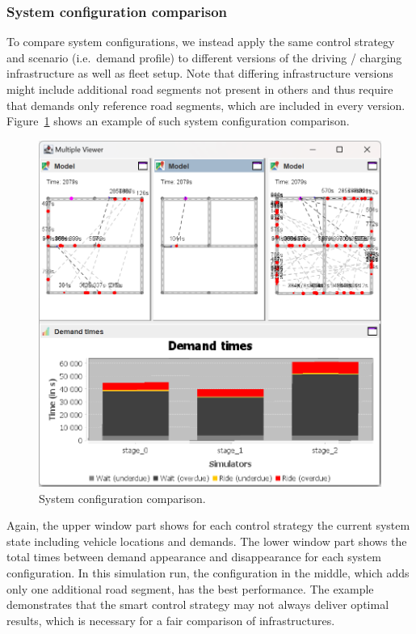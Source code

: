 \documentclass[a4paper,twoside]{article}
\begin{document}
	\subsubsection{System configuration comparison}
	\label{sec:infrastructure-comparison}
	
	To compare system configurations, we instead apply the same control strategy and scenario (i.e.\ demand profile) to different versions of the driving / charging infrastructure as well as fleet setup.
	Note that differing infrastructure versions might include additional road segments not present in others and thus require that demands only reference road segments, which are included in every version.
	Figure~\ref{fig:infratructure-comparison} shows an example of such system configuration comparison.
	\begin{figure}[!ht]
		\centering
		\includegraphics[width=0.85\columnwidth]{infrastructure_comparison.png}
		\caption{System configuration comparison.}
		\label{fig:infratructure-comparison}
	\end{figure}
	Again, the upper window part shows for each control strategy the current system state including vehicle locations and demands.
	The lower window part shows the total times between demand appearance and disappearance for each system configuration.
	In this simulation run, the configuration in the middle, which adds only one additional road segment, has the best performance.
	The example demonstrates that the smart control strategy may not always deliver optimal results, which is necessary for a fair comparison of infrastructures.
	
\end{document}
